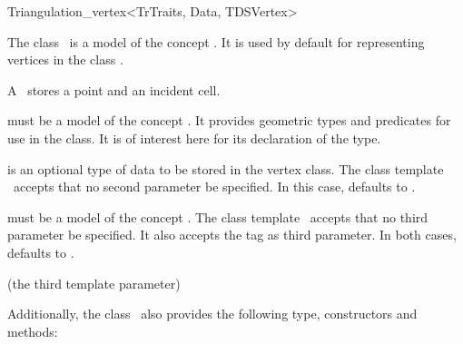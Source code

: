 \begin{ccRefClass}{Triangulation_vertex<TrTraits, Data, TDSVertex>}

\ccDefinition

The class \ccRefName\ is a model of the concept . It is
used by default for representing vertices in the class
.

A \ccRefName\ stores a point and an incident cell.


\ccParameters

 must be a model of the concept . It
provides geometric types and predicates for use in the
 class. It is of interest here for its
declaration of the  type.

 is an optional type of data to be stored in the vertex class. The
class template \ccRefName\ accepts that no second parameter be specified. In
this case,  defaults to .

 must be a model of the concept . The
class template \ccRefName\ accepts that no third parameter be specified. It
also accepts the tag  as third parameter. In both cases,
 defaults to .

\ccInheritsFrom

 (the third template parameter)

\ccIsModel


Additionally, the class \ccRefName\ also provides the following type,
constructors and methods:

\ccTypes


\ccCreation
{}



\end{ccRefClass}
